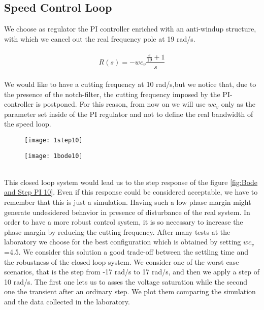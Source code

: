 \newpage
\subsection{Speed Control Loop}
We choose as regulator the PI controller enriched with an anti-windup structure, with which we cancel out the real frequency pole at 19 rad/s. \\
\\
\[
R(s)=-wc_v
\frac{\frac{s}{19}+1}{s}
\]
\\

We would like to have a cutting frequency at 10 rad/s,but we notice that, due to the presence of the notch-filter, the cutting frequency imposed by the PI-controller is postponed. For this reason, from now on we will use $wc_v$ only as the parameter set inside of the PI regulator and not to define the real bandwidth of the speed loop.
\\
\begin{figure*}[h]
	\centering
	\begin{subfigure}{0.45\columnwidth}
		\texttt{[image: 1step10]}
	\end{subfigure}
	\begin{subfigure}{0.45\columnwidth}
		\texttt{[image: 1bode10]}
	\end{subfigure}
	\caption{Speed control loop with  $wc_{v} $=10 rad/s}
	\label{fig:Bode and Step PI 10}
\end{figure*}
\\
This closed loop system would lead us to the step response of the figure \ref{fig:Bode and Step PI 10}. 
Even if this response could be considered acceptable, we have to remember that this is just a simulation. Having such a low phase margin might generate undesidered behavior in presence of disturbance of the real system. In order to have a more robust control system, it is so necessary to increase the phase margin by reducing the cutting frequency. 
\newline After many tests at the laboratory we choose for the best configuration which is obtained by setting $wc_{v} $=4.5. We consider this solution a good trade-off between the settling time and the robustness of the closed loop system.
We consider one of the worst case scenarios, that is the step from -17 rad/s to 17 rad/s, and then we apply a step of 10 rad/s. The first one lets us to asses the voltage saturation while the second one the transient after an ordinary step.
We plot them comparing the simulation and the data collected in the laboratory.

